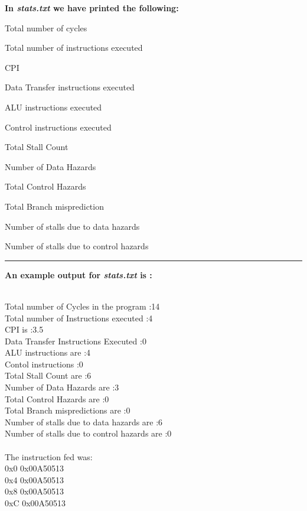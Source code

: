 \documentclass{article}
\begin{document}
\newpage
\Large
\textbf{In \textsl{stats.txt} we have printed the following:}

\begin{enumerate}
\begin{LARGE}
\item \textsf{Total number of cycles}
\item \textsf{Total number of instructions executed}
\item \textsf{CPI}
\item \textsf{Data Transfer instructions executed}
\item \textsf{ALU instructions executed}
\item \textsf{Control instructions executed}
\item \textsf{Total Stall Count}
\item \textsf{Number of Data Hazards}
\item \textsf{Total Control Hazards}
\item \textsf{Total Branch misprediction}
\item \textsf{Number of stalls due to data hazards}
\item \textsf{Number of stalls due to control hazards}
\end{LARGE}
\end{enumerate}

\par\noindent\rule{\textwidth}{0.4pt}



\noindent
\textbf{An example output for \textsl{stats.txt} is :}\\
\\
\begin{LARGE}
\textsf{Total number of Cycles in the program :14}\\
\textsf{Total number of Instructions executed :4}\\
\textsf{CPI is :3.5}\\
\textsf{Data Transfer Instructions Executed :0}\\
\textsf{ALU instructions are :4}\\
\textsf{Contol instructions :0}\\
\textsf{Total Stall Count are :6}\\
\textsf{Number of Data Hazards are :3}\\
\textsf{Total Control Hazards are :0}\\
\textsf{Total Branch mispredictions are :0}\\
\textsf{Number of stalls due to data hazards are :6}\\
\textsf{Number of stalls due to control hazards are :0}\\\\
\textsf{The instruction fed was:}\\
\textsf{0x0	0x00A50513}\\
\textsf{0x4	0x00A50513}\\
\textsf{0x8	0x00A50513}\\
\textsf{0xC	0x00A50513}\\
\end{LARGE}
\vspace{0.6cm}
\end{document}
